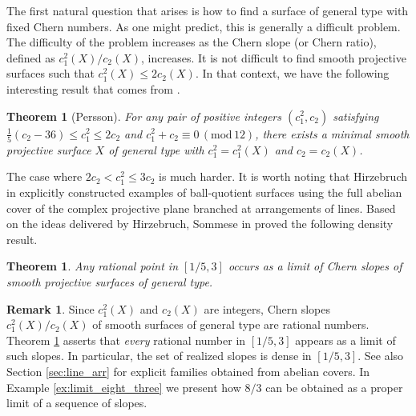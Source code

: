 \documentclass{article}
\theoremstyle{plain}
\newtheorem{theorem}[thm]{Theorem}
\theoremstyle{definition}
\newtheorem{remark}[thm]{Remark}
\numberwithin{equation}{section}
\begin{document}
The first natural question that arises is how to find a surface of general type with fixed Chern numbers. As one might predict, this is generally a difficult problem. The difficulty of the problem increases as the Chern slope (or Chern ratio), defined as $c_{1}^{2}(X)/c_{2}(X)$, increases. It is not difficult to find smooth projective surfaces such that $c_{1}^{2}(X) \leq 2c_{2}(X)$. In that context, we have the following interesting result that comes from \cite{Persson}.
\begin{theorem}[Persson]
For any pair of positive integers $(c_{1}^{2},c_{2})$ satisfying   $\frac{1}{5}(c_{2}-36)\leq c_{1}^{2} \leq 2c_{2}$ and $c_{1}^{2} + c_{2} \equiv 0\, (\textrm{mod} \, 12)$, there exists a minimal smooth projective surface $X$ of general type with $c_{1}^{2} = c_{1}^{2}(X)$ and $c_{2}=c_{2}(X)$.  
\end{theorem}
The case where $2c_{2} < c_{1}^{2} \leq 3c_{2}$ is much harder. It is worth noting that Hirzebruch in \cite{Hirzebruch} explicitly constructed examples of ball-quotient surfaces using the full abelian cover of the complex projective plane branched at arrangements of lines. Based on the ideas delivered by Hirzebruch, Sommese in \cite{Sommese} proved the following density result.
\begin{theorem}\label{thm:dense_limits}
Any rational point in $[1/5, 3]$ occurs as a limit of Chern slopes of smooth projective surfaces of general type.
\end{theorem}

\begin{remark}
Since $c_1^2(X)$ and $c_2(X)$ are integers, Chern slopes $c_1^2(X)/c_2(X)$ of smooth surfaces of general type are rational numbers. Theorem \ref{thm:dense_limits} asserts that \textit{every} rational number in $[1/5,3]$ appears as a limit of such slopes. In particular, the set of realized slopes is dense in $[1/5,3]$. See also Section \ref{sec:line_arr} for explicit families obtained from abelian covers. In Example \ref{ex:limit_eight_three} we present how $8/3$ can be obtained as a proper limit of a sequence of slopes.
\end{remark}
\end{document}

